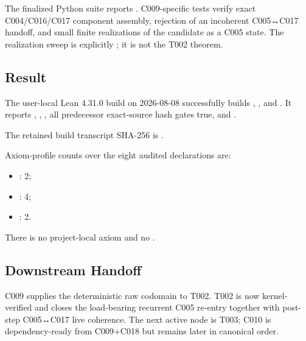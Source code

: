 The finalized Python suite reports
\texttt{\protect{}}. C009-specific tests verify
exact C004/C016/C017 component assembly, rejection of an incoherent
C005↔C017 handoff, and small finite realizations of the candidate as a
C005 state. The realization sweep is explicitly
\texttt{\protect{}}; it is not the T002 theorem.

\subsection{Result}\label{result-29}

The user-local Lean 4.31.0 build on 2026-08-08 successfully builds
\texttt{\protect{}},
\texttt{\protect{}}, and
\texttt{\protect{}}. It reports
\texttt{\protect{}},
\texttt{\protect{}},
\texttt{\protect{}}, all predecessor
exact-source hash gates true, and
\texttt{\protect{}}.

The retained build transcript SHA-256 is
\texttt{\protect{}}.

Axiom-profile counts over the eight audited declarations are:

\begin{itemize}
\tightlist
\item
  \texttt{\protect{}}: 2;
\item
  \texttt{\protect{}}: 4;
\item
  \texttt{\protect{}}: 2.
\end{itemize}

There is no project-local axiom and no \texttt{\protect{}}.

\subsection{Downstream Handoff}\label{downstream-handoff-29}

C009 supplies the deterministic raw codomain to T002. T002 is now
kernel-verified and closes the load-bearing recurrent C005 re-entry
together with post-step C005↔C017 live coherence. The next active node
is T003; C010 is dependency-ready from C009+C018 but remains later in
canonical order.

